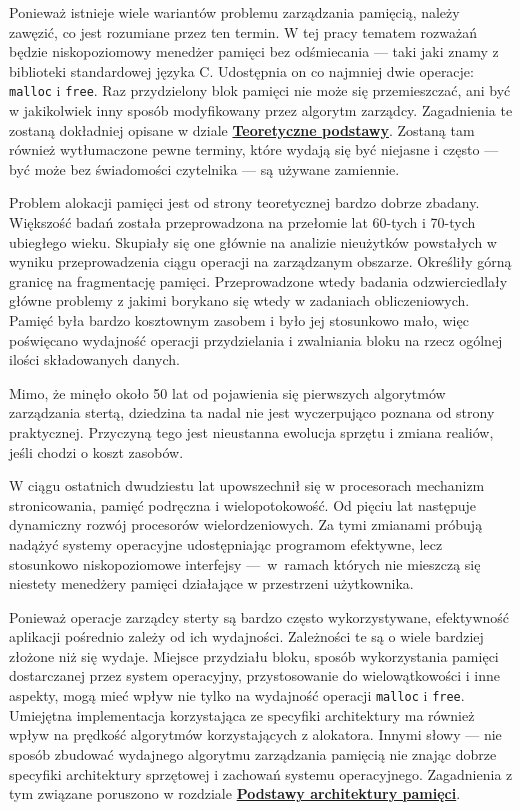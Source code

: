 \documentclass[12pt,a4paper,titlepage,twoside]{mwart}
\begin{document}
Ponieważ istnieje wiele wariantów problemu zarządzania pamięcią, należy
zawęzić, co jest rozumiane przez ten termin. W tej pracy tematem rozważań
będzie niskopoziomowy menedżer pamięci bez odśmiecania --- taki jaki znamy z
biblioteki standardowej języka C. Udostępnia on co najmniej dwie operacje:
\texttt{malloc} i \texttt{free}. Raz przydzielony blok pamięci nie może się
przemieszczać, ani być w jakikolwiek inny sposób modyfikowany przez algorytm
zarządcy. Zagadnienia te zostaną dokładniej opisane w dziale
\hyperlink{Teoria}{\textbf{Teoretyczne podstawy}}. Zostaną tam również
wytłumaczone pewne terminy, które wydają się być niejasne i często --- być może
bez świadomości czytelnika --- są używane zamiennie.

Problem alokacji pamięci jest od strony teoretycznej bardzo dobrze zbadany.
Większość badań została przeprowadzona na przełomie lat 60-tych i 70-tych
ubiegłego wieku. Skupiały się one głównie na analizie nieużytków powstałych w
wyniku przeprowadzenia ciągu operacji na zarządzanym obszarze. Określiły górną
granicę na fragmentację pamięci. Przeprowadzone wtedy badania odzwierciedlały
główne problemy z jakimi borykano się wtedy w zadaniach obliczeniowych. Pamięć
była bardzo kosztownym zasobem i było jej stosunkowo mało, więc poświęcano
wydajność operacji przydzielania i zwalniania bloku na rzecz ogólnej ilości
składowanych danych.

Mimo, że minęło około 50 lat od pojawienia się pierwszych algorytmów
zarządzania stertą, dziedzina ta nadal nie jest wyczerpująco poznana od strony
praktycznej. Przyczyną tego jest nieustanna ewolucja sprzętu i zmiana realiów,
jeśli chodzi o koszt zasobów.

W ciągu ostatnich dwudziestu lat upowszechnił się w procesorach mechanizm
stronicowania, pamięć podręczna i wielopotokowość. Od pięciu lat następuje
dynamiczny rozwój procesorów wielordzeniowych. Za tymi zmianami próbują nadążyć
systemy operacyjne udostępniając programom efektywne, lecz stosunkowo
niskopoziomowe interfejsy ---~w~ramach których nie mieszczą się niestety
menedżery pamięci działające w przestrzeni użytkownika.

Ponieważ operacje zarządcy sterty są bardzo często wykorzystywane,
efektywność aplikacji pośrednio zależy od ich wydajności. Zależności te są o
wiele bardziej złożone niż się wydaje. Miejsce przydziału bloku, sposób
wykorzystania pamięci dostarczanej przez system operacyjny, przystosowanie do
wielowątkowości i inne aspekty, mogą mieć wpływ nie tylko na wydajność operacji
\texttt{malloc} i \texttt{free}. Umiejętna implementacja korzystająca ze
specyfiki architektury ma również wpływ na prędkość algorytmów korzystających z
alokatora. Innymi słowy --- nie sposób zbudować wydajnego algorytmu zarządzania
pamięcią nie znając dobrze specyfiki architektury sprzętowej i zachowań systemu
operacyjnego. Zagadnienia z tym związane poruszono w rozdziale
\hyperlink{Architektura}{\textbf{Podstawy architektury pamięci}}.
\end{document}

